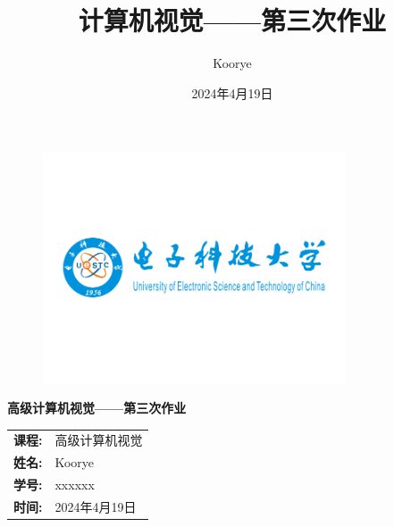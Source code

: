 \documentclass{article}
\title{计算机视觉——第三次作业}
\author{Koorye}
\date{2024年4月19日}
\begin{document}

\thispagestyle{empty}

\begin{figure}[t]
    \centering
    \includegraphics[width=0.8\textwidth]{pics/logo.png}
\end{figure}

\vspace*{\fill}
    \begin{center}
        \huge\textbf{高级计算机视觉——第三次作业}
    \end{center}
\vspace*{\fill}

\begin{table}[b]
    \centering
    \large
    \begin{tabular}{ll}
    \textbf{课程:} & 高级计算机视觉 \\
    \textbf{姓名:} & Koorye \\
    \textbf{学号:} & xxxxxx \\
    \textbf{时间:} & 2024年4月19日 \\
    \end{tabular}
\end{table}

\newpage
\tableofcontents

\newpage










\newpage

\end{document}
